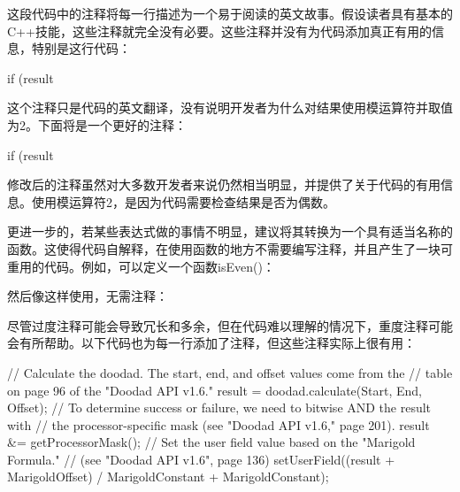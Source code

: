 
这段代码中的注释将每一行描述为一个易于阅读的英文故事。假设读者具有基本的C++技能，这些注释就完全没有必要。这些注释并没有为代码添加真正有用的信息，特别是这行代码：

\begin{cpp}
if (result %
\end{cpp}

这个注释只是代码的英文翻译，没有说明开发者为什么对结果使用模运算符并取值为2。下面将是一个更好的注释：

\begin{cpp}
if (result %
\end{cpp}

修改后的注释虽然对大多数开发者来说仍然相当明显，并提供了关于代码的有用信息。使用模运算符2，是因为代码需要检查结果是否为偶数。

更进一步的，若某些表达式做的事情不明显，建议将其转换为一个具有适当名称的函数。这使得代码自解释，在使用函数的地方不需要编写注释，并且产生了一块可重用的代码。例如，可以定义一个函数isEven()：


然后像这样使用，无需注释：

\begin{cpp}
if (isEven(result)) {
\end{cpp}

尽管过度注释可能会导致冗长和多余，但在代码难以理解的情况下，重度注释可能会有所帮助。以下代码也为每一行添加了注释，但这些注释实际上很有用：

\begin{cpp}
// Calculate the doodad. The start, end, and offset values come from the
// table on page 96 of the "Doodad API v1.6."
result = doodad.calculate(Start, End, Offset);
// To determine success or failure, we need to bitwise AND the result with
// the processor-specific mask (see "Doodad API v1.6," page 201).
result &= getProcessorMask();
// Set the user field value based on the "Marigold Formula."
// (see "Doodad API v1.6", page 136)
setUserField((result + MarigoldOffset) / MarigoldConstant + MarigoldConstant);
\end{cpp}

